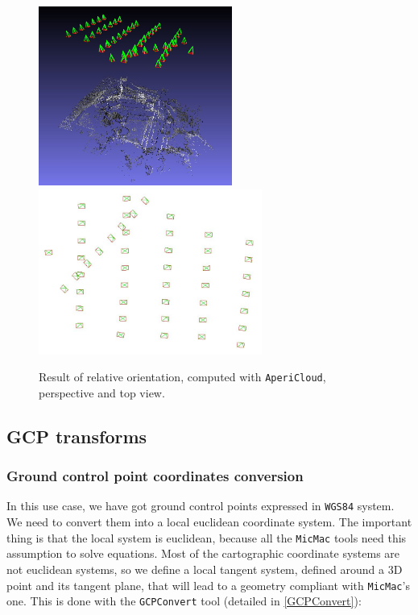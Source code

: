 \begin{figure}[H]
\begin{center}
\includegraphics[width=180pt]{FIGS/Cuxa/AperiCloud.jpg}
\includegraphics[width=208pt]{FIGS/Cuxa/Aero.jpg}
\caption{Result of relative orientation, computed with {\tt AperiCloud}, perspective and top view.}
\end{center}
\end{figure}


\subsection{GCP transforms}
		

\subsubsection{Ground control point coordinates conversion}

In this use case, we have got ground control points expressed in {\tt WGS84} system. We need to convert them into a local euclidean coordinate system. The important thing is that the local system is euclidean, because all the {\tt MicMac} tools
need this assumption to solve equations. Most of the cartographic coordinate systems are not euclidean systems, so we define a local tangent system, defined around a 3D point and its tangent plane, that will lead to a geometry compliant with {\tt MicMac}'s one.
This is done with the {\tt GCPConvert} tool (detailed in \ref{GCPConvert}):

